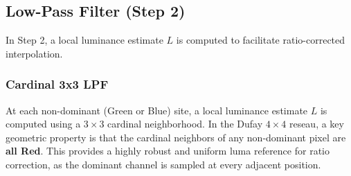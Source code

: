 \documentclass[a4paper,11pt]{article}
\newcommand{\tile}[6][]{%
  \if#4r\def\tilecol{cfared}\else
    \if#4g\def\tilecol{cfagreen}\else
      \if#4b\def\tilecol{cfablue}\else
        \def\tilecol{cfagrey}\fi\fi\fi
  \node[cfa-tile, fill=\tilecol!60, #1] (T#2#3) at (#2*0.8, -#3*0.8) {};
  \ifx&#5&\else\node[cfa-coords, above=0pt of T#2#3] {#5};\fi
  \ifx&#6&\else\node[cfa-weight] at (T#2#3) {#6};\fi
}
\newcommand{\dufaytile}[5][]{%
  \pgfmathtruncatemacro{\cfas}{mod(int(#2)+int(#3),4)}%
  \ifcase\cfas\tile[#1]{#2}{#3}{g}{#4}{#5}%
  \or\tile[#1]{#2}{#3}{r}{#4}{#5}%
  \or\tile[#1]{#2}{#3}{b}{#4}{#5}%
  \or\tile[#1]{#2}{#3}{r}{#4}{#5}\fi
}
\begin{document}
\begin{center}
\end{center}

\subsection{Low-Pass Filter (Step 2)}

In Step 2, a local luminance estimate $L$ is computed to facilitate ratio-corrected interpolation. 

\subsubsection{Cardinal 3x3 LPF}
At each non-dominant (Green or Blue) site, a local luminance estimate $L$ is computed using a $3\times3$ cardinal neighborhood. In the Dufay $4\times4$ reseau, a key geometric property is that the cardinal neighbors of any non-dominant pixel are \textbf{all Red}. This provides a highly robust and uniform luma reference for ratio correction, as the dominant channel is sampled at every adjacent position.

\begin{center}
\end{center}
\end{document}
